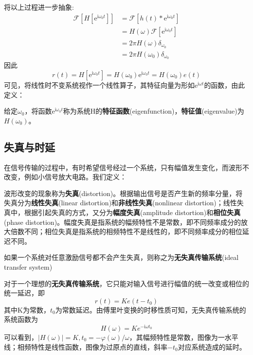 将以上过程进一步抽象:
\begin{align*}
    \mathcal{F}\left[H[\mathrm{e}^{\mathrm{i}\omega_0 t}]\right]&=\mathcal{F} \left[h(t)*\mathrm{e}^{\mathrm{i}\omega_0 t}\right]\\
    &=H(\omega)\mathcal{F} \left[\mathrm{e}^{\mathrm{i}\omega_0 t}\right]\\
    &=2\pi H(\omega)\delta_{\omega_0}\\
    &=2\pi H(\omega_0)\delta_{\omega_0}
\end{align*}
因此\[r(t)=H\left[\mathrm{e}^{\mathrm{i}\omega_0 t}\right]=H(\omega_0)\mathrm{e}^{\mathrm{i}\omega_0 t}=H(\omega_0)e(t)\]
可见，将线性时不变系统视作一个线性算子，其特征向量为形如$\mathrm{e}^{\mathrm{i}\omega t}$的函数，由此定义：
\begin{definition}[特征函数]\label{def:eigenfunction}
    给定$\omega_0$，将函数$\mathrm{e}^{\mathrm{i}\omega_0 t}$称为系统H的\textbf{特征函数}(eigenfunction)，\textbf{特征值}(eigenvalue)为$H(\omega_0)$。
\end{definition}

\subsection{失真与时延}\label{sub:distortion}

在信号传输的过程中，有时希望信号经过一个系统，只有幅值发生变化，而波形不改变，例如小信号放大电路。我们定义：
\begin{definition}[失真]
波形改变的现象称为\textbf{失真}(distortion)。根据输出信号是否产生新的频率分量，将失真分为\textbf{线性失真}(linear distortion)和\textbf{非线性失真}(nonlinear distortion)；线性失真中，根据引起失真的方式，又分为\textbf{幅度失真}(amplitude distortion)和\textbf{相位失真}(phase distortion)。幅度失真是指系统的幅频特性不是常数，即不同频率成分的放大倍数不同；相位失真是指系统的相频特性不是线性的，即不同频率成分的相位延迟不同。
\end{definition}
\begin{definition}[无失真传输系统]
如果一个系统对任意激励信号都不会产生失真，则称之为\textbf{无失真传输系统}(ideal transfer system)
\end{definition}

对于一个理想的\textbf{无失真传输系统}，它只能对输入信号进行幅值的统一改变或相位的统一延迟，即\[r(t)=Ke(t-t_0)\]其中K为常数，$t_0$为常数延迟。由傅里叶变换的时移性质可知，无失真传输系统的系统函数为
\[H(\omega) = Ke^{-\mathrm{i}\omega t_0}\]
可以看到，$\left|H(\omega)\right|=K,t_0=-\varphi(\omega)/\omega$，其幅频特性是常数，图像为一水平线；相频特性是线性函数，图像为过原点的直线，斜率$-t_0$对应系统造成的延时。

